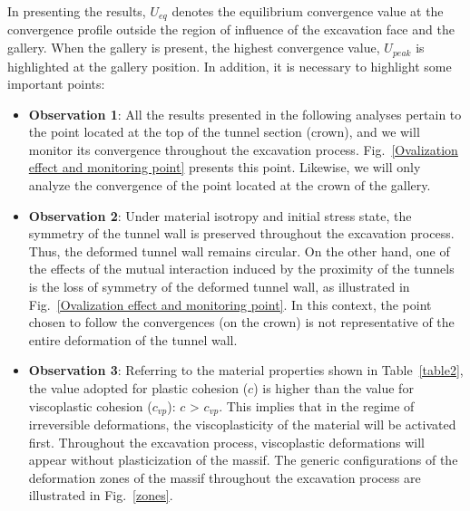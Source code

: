 \documentclass[a4paper,fleqn]{cas-sc}
\begin{document}
\FloatBarrier
In presenting the results, $U_{eq}$ denotes the equilibrium convergence value at the convergence profile outside the region of influence of the excavation face and the gallery. When the gallery is present, the highest convergence value, $U_{peak}$ is highlighted at the gallery position. In addition, it is necessary to highlight some important points:

\begin{itemize}[]
	
	\item \textbf{Observation 1}: All the results presented in the following analyses pertain to the point located at the top of the tunnel section (crown), and we will monitor its convergence throughout the excavation process. Fig.~\ref{Ovalization effect and monitoring point} presents this point. Likewise, we will only analyze the convergence of the point located at the crown of the gallery. 

	\item \textbf{Observation 2}: Under material isotropy and initial stress state, the symmetry of the tunnel wall is preserved throughout the excavation process. Thus, the deformed tunnel wall remains circular. On the other hand, one of the effects of the mutual interaction induced by the proximity of the tunnels is the loss of symmetry of the deformed tunnel wall, as illustrated in Fig.~\ref{Ovalization effect and monitoring point}. In this context, the point chosen to follow the convergences (on the crown) is not representative of the entire deformation of the tunnel wall. 
	
	\item \textbf{Observation 3}: Referring to the material properties shown in Table~\ref{table2}, the value adopted for plastic cohesion ($c$) is higher than the value for viscoplastic cohesion ($c_{vp}$): $c$ > $c_{vp}$. This implies that in the regime of irreversible deformations, the viscoplasticity of the material will be activated first. Throughout the excavation process, viscoplastic deformations will appear without plasticization of the massif. The generic configurations of the deformation zones of the massif throughout the excavation process are illustrated in Fig.~\ref{zones}.
	
\end{itemize}
\end{document}
